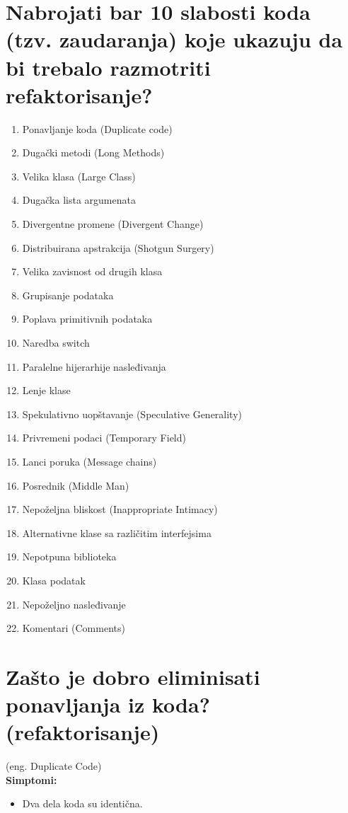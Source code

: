 \documentclass[a4paper]{article}
\begin{document}
\section{Nabrojati bar 10 slabosti koda (tzv. zaudaranja) 
         koje ukazuju da bi trebalo razmotriti refaktorisanje?} 
\begin{enumerate}
  \item Ponavljanje koda (Duplicate code)
  \item Dugački metodi (Long Methods)
  \item Velika klasa (Large Class)
  \item Dugačka lista argumenata
  \item Divergentne promene (Divergent Change)
  \item Distribuirana apstrakcija (Shotgun Surgery)
  \item Velika zavisnost od drugih klasa 
  \item Grupisanje podataka
  \item Poplava primitivnih podataka
  \item Naredba switch
  \item Paralelne hijerarhije nasleđivanja
  \item Lenje klase
  \item Spekulativno uopštavanje (Speculative Generality)
  \item Privremeni podaci (Temporary Field)
  \item Lanci poruka (Message chains)
  \item Posrednik (Middle Man)
  \item Nepoželjna bliskost (Inappropriate Intimacy)
  \item Alternativne klase sa različitim interfejsima
  \item Nepotpuna biblioteka
  \item Klasa podatak
  \item Nepoželjno nasleđivanje
  \item Komentari (Comments) \cite{rg_refactoring}
\end{enumerate}

\section{Zašto je dobro eliminisati ponavljanja iz koda? (refaktorisanje)}
  (eng. Duplicate Code)\\
  \textbf{Simptomi:}
  \begin{itemize}
    \item Dva dela koda su identična.
  \end{itemize}
\end{document}
